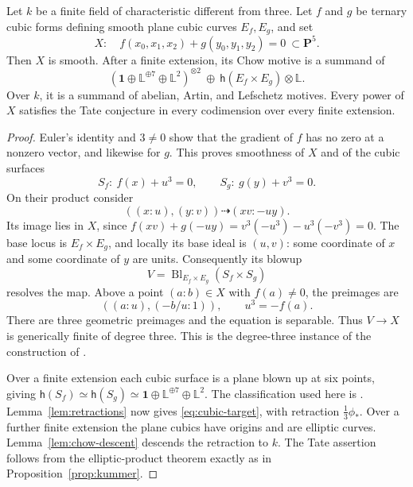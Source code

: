 \begin{proposition}\label{prop:cubic-join}
Let $k$ be a finite field of characteristic different from three.
Let $f$ and $g$ be ternary cubic forms defining smooth plane cubic
curves $E_f,E_g$, and set
\[
 X:\quad f(x_0,x_1,x_2)+g(y_0,y_1,y_2)=0\ \subset\mathbf P^5.
\]
Then $X$ is smooth. After a finite extension, its Chow motive is a
summand of
\begin{equation}\label{eq:cubic-target}
 (\mathbf1\oplus\mathbb L^{\oplus7}\oplus\mathbb L^2)^{\otimes2}
       \ \oplus\ \mathsf h(E_f\times E_g)\otimes\mathbb L.
\end{equation}
Over $k$, it is a summand of abelian, Artin, and Lefschetz motives.
Every power of $X$ satisfies the Tate conjecture in every codimension
over every finite extension.
\end{proposition}

\begin{proof}
Euler's identity and $3\ne0$ show that the gradient of $f$ has
no zero at a nonzero vector, and likewise for $g$. This proves
smoothness of $X$ and of the cubic surfaces
\[
 S_f:\ f(x)+u^3=0,\qquad S_g:\ g(y)+v^3=0.
\]
On their product consider
\[
 ((x:u),(y:v))\dashrightarrow(xv:-uy).
\]
Its image lies in $X$, since
$f(xv)+g(-uy)=v^3(-u^3)-u^3(-v^3)=0$.
The base locus is $E_f\times E_g$, and locally its base ideal is
$(u,v)$: some coordinate of $x$ and some coordinate of $y$ are units.
Consequently its blowup
\[
 V=\operatorname{Bl}_{E_f\times E_g}(S_f\times S_g)
\]
resolves the map. Above a point $(a:b)\in X$ with $f(a)\ne0$,
the preimages are
\[
 ((a:u),(-b/u:1)),\qquad u^3=-f(a).
\]
There are three geometric preimages and the equation is separable.
Thus $V\to X$ is generically finite of degree three. This is the
degree-three instance of the construction of
\citet[Remark 1.10, p.~102]{ShiodaKatsura1979}.

Over a finite extension each cubic surface is a plane blown up at
six points, giving
$\mathsf h(S_f)\simeq\mathsf h(S_g)\simeq
\mathbf1\oplus\mathbb L^{\oplus7}\oplus\mathbb L^2$.
The classification used here is
\citet[Theorem 9.4.4, p.~276]{Poonen2017}.
Lemma~\ref{lem:retractions} now gives \eqref{eq:cubic-target},
with retraction $\frac13\phi_*$. Over a further finite extension
the plane cubics have origins and are elliptic curves.
Lemma~\ref{lem:chow-descent} descends the retraction to $k$.
The Tate assertion follows from the elliptic-product theorem exactly
as in Proposition~\ref{prop:kummer}.
\end{proof}

